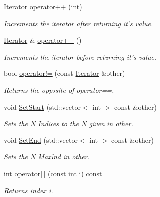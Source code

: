 \begin{DoxyCompactItemize}
\hyperlink{classJKBuilder_1_1Iterator}{Iterator} \hyperlink{classJKBuilder_1_1Iterator_ac1702aedba13b4112b891b58dfd78eba}{operator++} (int)
\begin{DoxyCompactList}\small\item\em Increments the iterator after returning it's value. \item\end{DoxyCompactList}\item 
\hyperlink{classJKBuilder_1_1Iterator}{Iterator} \& \hyperlink{classJKBuilder_1_1Iterator_ae1f21c74128a5ef5d1b9de72ceb09be8}{operator++} ()
\begin{DoxyCompactList}\small\item\em Increments the iterator before returning it's value. \item\end{DoxyCompactList}\item 
bool \hyperlink{classJKBuilder_1_1Iterator_a8c06af8ae0d9d1614ae9f81629275926}{operator!=} (const \hyperlink{classJKBuilder_1_1Iterator}{Iterator} \&other)
\begin{DoxyCompactList}\small\item\em Returns the opposite of operator==. \item\end{DoxyCompactList}\item 
void \hyperlink{classJKBuilder_1_1Iterator_aa83de505e29125c1d3ac7bb1b13ca15a}{SetStart} (std::vector$<$ int $>$ const \&other)
\begin{DoxyCompactList}\small\item\em Sets the N Indices to the N given in other. \item\end{DoxyCompactList}\item 
void \hyperlink{classJKBuilder_1_1Iterator_aad84ec668b5f41210db34c540aaa31fc}{SetEnd} (std::vector$<$ int $>$ const \&other)
\begin{DoxyCompactList}\small\item\em Sets the N MaxInd in other. \item\end{DoxyCompactList}\item 
int \hyperlink{classJKBuilder_1_1Iterator_a74247cf730a06b23fcb1ec64e5596b25}{operator\mbox{[}$\,$\mbox{]}} (const int i) const 
\begin{DoxyCompactList}\small\item\em Returns index i. \item\end{DoxyCompactList}\end{DoxyCompactItemize}
